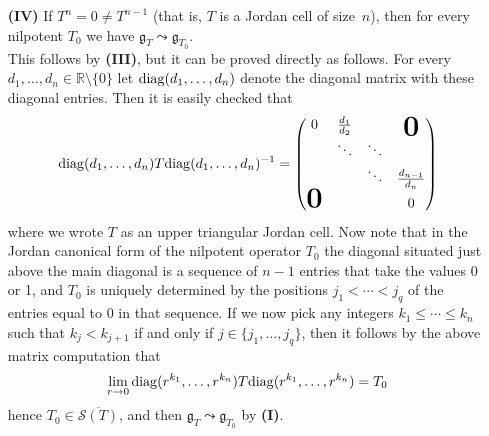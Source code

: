 \documentclass[
reqno]{amsart}
\begin{document}
\begin{remark}
\begin{itemize}
\item[{\bf (IV)}] If $T^n=0\ne T^{n-1}$ (that is, $T$ is a Jordan cell of size~$n$), 
then for every nilpotent $T_0$ we have ${{\mathfrak g}}_T{\leadsto}{{\mathfrak g}}_{T_0}$. 
\\ This follows by {\bf (III)}, but it can be proved directly as follows. 
For every $d_1,\dots,d_n\in{{\mathbb R}}\setminus\{0\}$ let ${{\rm diag}}(d_1,\dots,d_n)$ 
denote the diagonal matrix with these diagonal entries. 
Then it is easily checked that 
$${{\rm diag}}(d_1,\dots,d_n)T{{\rm diag}}(d_1,\dots,d_n)^{-1}=
\begin{pmatrix}
0 & \frac{d_1}{d_2} &        & \raisebox{-5pt}{\text{\bf\huge 0}}\\
  &\ddots                &\ddots  & \\
  &                      &   \ddots     & \frac{d_{n-1}}{{d_n}} \\
\text{\bf\huge 0}  &                      &        & 0
\end{pmatrix}
 $$ 
where we wrote $T$ as an upper triangular Jordan cell. 
Now note that in the Jordan canonical form of the nilpotent operator $T_0$ 
 the diagonal situated just above the main diagonal is a sequence 
of $n-1$ entries that take the values  0 or 1, 
and $T_0$ is uniquely determined by the positions $j_1<\cdots<j_q$ of the entries 
equal to 0 in that sequence. 
If we now pick any integers $k_1\le\cdots\le k_n$ such that 
$k_j<k_{j+1}$ if and only if $j\in\{j_1,\dots,j_q\}$, 
then it follows by the above matrix computation 
that 
$$\lim\limits_{r\to 0}{{\rm diag}}(r^{k_1},\dots,r^{k_n})T{{\rm diag}}(r^{k_1},\dots,r^{k_n})=T_0$$ 
hence $T_0\in\overline{{{\mathcal S}}(T)}$, and then ${{\mathfrak g}}_T{\leadsto}{{\mathfrak g}}_{T_0}$ by {\bf (I)}. 

\end{itemize}
\end{remark}
\end{document}
